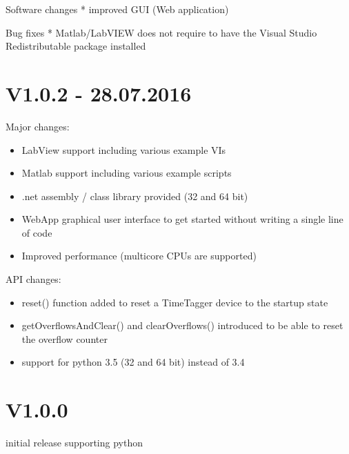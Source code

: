 \documentclass[letterpaper,10pt,english]{sphinxmanual}
\begin{document}
Software changes
* improved GUI (Web application)

Bug fixes
* Matlab/LabVIEW does not require to have the Visual Studio Redistributable package installed


\section{V1.0.2 - 28.07.2016}
\label{sections/changelog:v1-0-2-28-07-2016}
Major changes:
\begin{itemize}
\item {} 
LabView support including various example VIs

\item {} 
Matlab support including various example scripts

\item {} 
.net assembly / class library provided (32 and 64 bit)

\item {} 
WebApp graphical user interface to get started without writing a single line of code

\item {} 
Improved performance (multicore CPUs are supported)

\end{itemize}

API changes:
\begin{itemize}
\item {} 
reset() function added to reset a TimeTagger device to the startup state

\item {} 
getOverflowsAndClear() and clearOverflows() introduced to be able to reset the overflow counter

\item {} 
support for python 3.5 (32 and 64 bit) instead of 3.4

\end{itemize}


\section{V1.0.0}
\label{sections/changelog:v1-0-0}
initial release supporting python



\renewcommand{\indexname}{Index}
\printindex
\end{document}

